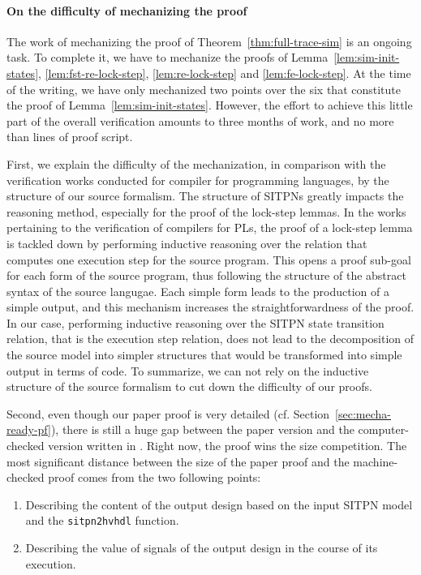 \paragraph{On the difficulty of mechanizing the proof}

The work of mechanizing the proof of Theorem~\ref{thm:full-trace-sim}
is an ongoing task. To complete it, we have to mechanize the proofs of
Lemma~\ref{lem:sim-init-states}, \ref{lem:fst-re-lock-step},
\ref{lem:re-lock-step} and \ref{lem:fe-lock-step}. At the time of the
writing, we have only mechanized two points over the six that
constitute the proof of Lemma~\ref{lem:sim-init-states}. However, the
effort to achieve this little part of the overall verification amounts
to three months of work, and no more than lines of proof
script.

\bigskip

First, we explain the difficulty of the mechanization, in comparison
with the verification works conducted for compiler for programming
languages, by the structure of our source
formalism.  %
The structure of SITPNs greatly impacts the reasoning method,
especially for the proof of the lock-step lemmas. In the works
pertaining to the verification of compilers for PLs, the proof of a
lock-step lemma is tackled down by performing inductive reasoning over
the relation that computes one execution step for the source
program. This opens a proof sub-goal for each form of the source
program, thus following the structure of the abstract syntax of the
source langugae. Each simple form leads to the production of a simple
output, and this mechanism increases the straightforwardness of the
proof. In our case, performing inductive reasoning over the SITPN
state transition relation, that is the execution step relation, does
not lead to the decomposition of the source model into simpler
structures that would be transformed into simple output in terms of
\vhdl{} code. To summarize, we can not rely on the inductive structure
of the source formalism to cut down the difficulty of our proofs.

\bigskip

Second, even though our paper proof is very detailed
(cf. Section~\ref{sec:mecha-ready-pf}), there is still a huge gap
between the paper version and the computer-checked version written in
\coq{}.  Right now, the \coq{} proof wins the size competition. The
most significant distance between the size of the paper proof and the
machine-checked proof comes from the two following points:
\begin{enumerate}
  
\item Describing the content of the output design based on the
  input SITPN model and the \texttt{sitpn2hvhdl} function.
\item Describing the value of signals of the output design in the
  course of its execution.
\end{enumerate}

